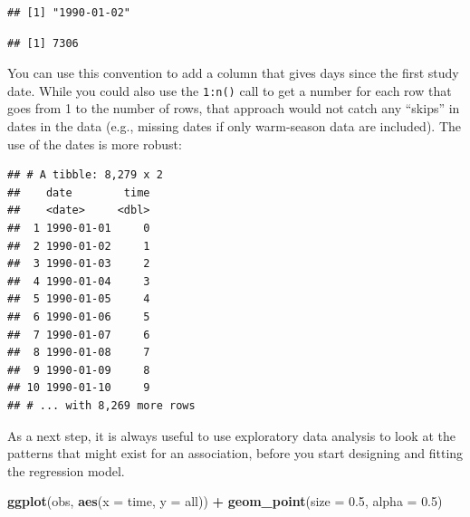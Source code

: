 \documentclass[
]{book}
\newenvironment{Shaded}{\begin{snugshade}}{\end{snugshade}}
\newcommand{\DataTypeTok}[1]{\textcolor[rgb]{0.13,0.29,0.53}{#1}}
\newcommand{\DecValTok}[1]{\textcolor[rgb]{0.00,0.00,0.81}{#1}}
\newcommand{\FloatTok}[1]{\textcolor[rgb]{0.00,0.00,0.81}{#1}}
\newcommand{\KeywordTok}[1]{\textcolor[rgb]{0.13,0.29,0.53}{\textbf{#1}}}
\newcommand{\NormalTok}[1]{#1}
\newcommand{\OperatorTok}[1]{\textcolor[rgb]{0.81,0.36,0.00}{\textbf{#1}}}
\newcommand{\StringTok}[1]{\textcolor[rgb]{0.31,0.60,0.02}{#1}}
\begin{document}
\begin{verbatim}
## [1] "1990-01-02"
\end{verbatim}

\begin{Shaded}
\end{Shaded}

\begin{verbatim}
## [1] 7306
\end{verbatim}

You can use this convention to add a column that gives days since the first
study date. While you could also use the \texttt{1:n()} call to get a number for
each row that goes from 1 to the number of rows, that approach would not
catch any ``skips'' in dates in the data (e.g., missing dates if only warm-season
data are included). The use of the dates is more robust:

\begin{Shaded}
\end{Shaded}

\begin{verbatim}
## # A tibble: 8,279 x 2
##    date        time
##    <date>     <dbl>
##  1 1990-01-01     0
##  2 1990-01-02     1
##  3 1990-01-03     2
##  4 1990-01-04     3
##  5 1990-01-05     4
##  6 1990-01-06     5
##  7 1990-01-07     6
##  8 1990-01-08     7
##  9 1990-01-09     8
## 10 1990-01-10     9
## # ... with 8,269 more rows
\end{verbatim}

As a next step, it is always useful to use exploratory data analysis to look
at the patterns that might exist for an association, before you start designing
and fitting the regression model.

\begin{Shaded}
\begin{Highlighting}[]
\KeywordTok{ggplot}\NormalTok{(obs, }
       \KeywordTok{aes}\NormalTok{(}\DataTypeTok{x =}\NormalTok{ time, }\DataTypeTok{y =}\NormalTok{ all)) }\OperatorTok{+}
\StringTok{  }\KeywordTok{geom_point}\NormalTok{(}\DataTypeTok{size =} \FloatTok{0.5}\NormalTok{, }\DataTypeTok{alpha =} \FloatTok{0.5}\NormalTok{)}
\end{Highlighting}
\end{Shaded}
\end{document}

